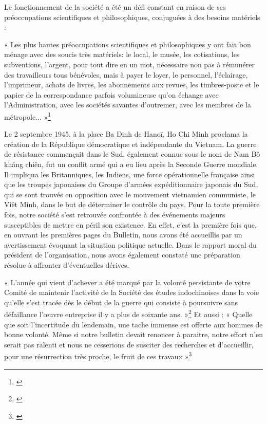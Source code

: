 Le fonctionnement de la société a été un défi constant en raison de ses préoccupations scientifiques et philosophiques, conjuguées à des besoins matériels : 

« Les plus hautes préoccupations scientifiques et philosophiques y ont fait bon ménage avec des soucis très matériels: le local, le musée, les cotisations, les subventions, l'argent, pour tout dire en un mot, nécessaire non pas à rémunérer des travailleurs tous bénévoles, mais à payer le loyer, le personnel, l'éclairage, l'imprimeur, achats de livres, les abonnements aux revues, les timbres-poste et le papier de la correspondance parfois volumineuse qu'on échange avec l'Administration, avec les sociétés savantes d'outremer, avec les membres de la métropole... »{\footnote{\cite{societe}}}

Le 2 septembre 1945, à la place Ba Dinh de Hanoï, Ho Chi Minh proclama la création de la République démocratique et indépendante du Vietnam. La guerre de résistance commençait dans le Sud, également connue sous le nom de Nam Bô kháng chiên, fut un conflit armé qui a eu lieu après la Seconde Guerre mondiale. Il impliqua les Britanniques, les Indiens, une force opérationnelle française ainsi que les troupes japonaises du Groupe d'armées expéditionnaire japonais du Sud, qui se sont trouvés en opposition avec le mouvement vietnamien communiste, le Viêt Minh, dans le but de déterminer le contrôle du pays. 
Pour la toute première fois, notre société s'est retrouvée confrontée à des événements majeurs susceptibles de mettre en péril son existence. En effet, c'est la première fois que, en ouvrant les premières pages du Bulletin, nous avons été accueillis par un avertissement évoquant la situation politique actuelle. Dans le rapport moral du président de l'organisation, nous avons également constaté une préparation résolue à affronter d'éventuelles dérives. 

« L’année qui vient d’achever a été marqué par la volonté persistante de votre Comité de maintenir l’activité de la Société des études indochinoises dans la voie qu’elle s’est tracée dès le début de la guerre qui consiste à poursuivre sans défaillance l’œuvre entreprise il y a plus de soixante ans. »\footnote{\cite{moral1}}
Et aussi : 
« Quelle que soit l’incertitude du lendemain, une tache immense est offerte aux hommes de bonne volonté. Même si notre bulletin devait renoncer à paraitre, notre effort n’en serait pas ralenti et nous ne cesserions de susciter des recherches et d’accueillir, pour une résurrection très proche, le fruit de ces travaux »\footnote{\cite{moral1}}

